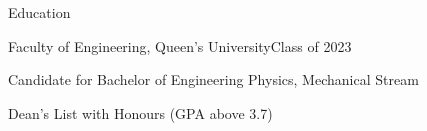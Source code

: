 \documentclass{resume} %
\begin{document}
\begin{rSection}{Education}

\begin{rSubsection}{Faculty of Engineering, Queen's University}{Class of 2023}{}{}
\item Candidate for Bachelor of Engineering Physics, Mechanical Stream
\item Dean's List with Honours (GPA above 3.7)
\end{rSubsection}
\end{rSection}
\end{document}
